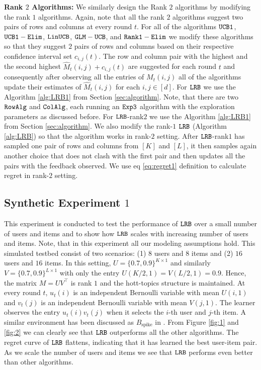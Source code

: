 
\textbf{Rank $2$ Algorithms:} We similarly design the Rank $2$ algorithms by modifying the rank $1$ algorithms. Again, note that all the rank $2$ algorithms suggest two pairs of rows and columns at every round $t$. For all of the algorithms ${\tt UCB1}$, ${\tt UCB1-Elim}$, ${\tt LinUCB}$, $\tt GLM-UCB$, and $\tt Rank1-Elim$ we modify these algorithms so that they suggest $2$ pairs of rows and columns based on their respective confidence interval set $c_{i, j}(t)$. The row and column pair with the highest and the second highest $\hat{M}_{t}(i,j) + c_{i, j}(t)$ are suggested for each round $t$ and consequently after observing all the entries of $M_t(i,j)$ all of the algorithms update their estimates of $\hat{M}_{t}(i,j)$ for each $i,j \in [d]$. For ${\tt LRB}$ we use the Algorithm \ref{alg:LRB1} from Section \ref{sec:algorithm}. Note, that there are two ${\tt RowAlg}$ and ${\tt ColAlg}$, each running an ${\tt Exp3}$ algorithm with the  exploration parameters as discussed before. For ${\tt LRB}$-rank$2$ we use the Algorithm \ref{alg:LRB1} from Section \ref{sec:algorithm}. We also modify the rank-$1$ ${\tt LRB}$ (Algorithm \ref{alg:LRB}) so that the algorithm works in rank-$2$ setting. After ${\tt LRB}$-rank$1$ has sampled one pair of rows and columns from $[K]$ and $[L]$, it then samples again another choice that does not clash with the first pair and then updates all the pairs with the feedback observed. We use eq \eqref{eq:regret1} definition to calculate regret in rank-$2$ setting.

\subsection{Synthetic Experiment $1$}
This experiment is conducted to test the performance of ${\tt LRB}$ over a small number of users and items and to show how ${\tt LRB}$ scales with increasing number of users and items. Note, that in this experiment all our modeling assumptions hold. This simulated testbed consist of two scenarios: (1) $8$ users and $8$ items and (2) $16$ users and $16$ items. In this setting, $U = \{0.7, 0.9\}^{K\times 1}$ and similarly $V = \{0.7, 0.9\}^{L\times 1}$ with only the entry $U(K/2,1) = V(L/2,1) = 0.9$. Hence, the matrix $M = UV^{\intercal}$ is rank $1$ and the hott-topics structure is maintained. At every round $t$, $u_t(i)$ is an independent Bernoulli variable with mean $U(i,1)$ and $v_t(j)$ is an independent Bernoulli variable with mean $V(j,1)$. The learner observes the entry $u_t(i)v_t(j)$ when it selects the $i$-th user and $j$-th item. A similar environment has been discussed as $B_{\text{spike}}$ in \citet{katariya2016stochastic}. From Figure \ref{fig:1} and \ref{fig:2} we can clearly see that ${\tt LRB}$ outperforms all the other algorithms. The regret curve of ${\tt LRB}$ flattens, indicating that it has learned the best user-item pair. As we scale the number of users and items we see that ${\tt LRB}$ performs even better than other algorithms. 


